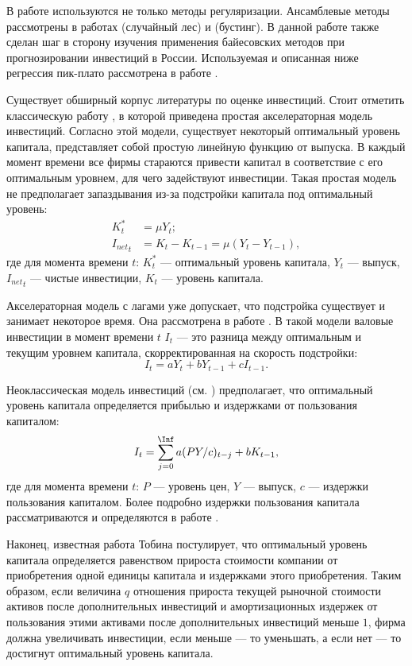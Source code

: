  
 В работе используются не только методы регуляризации. Ансамблевые методы рассмотрены в работах \cite{breiman2001random} (случайный лес) и \cite{efron1994introduction} (бустинг). В данной работе также сделан шаг в сторону изучения применения байесовских методов при прогнозировании инвестиций в России. Используемая и описанная ниже регрессия пик-плато рассмотрена в работе \cite{ishwaran2005spike}.

Существует обширный корпус литературы по оценке инвестиций. Стоит отметить классическую работу \cite{clark1917business}, в которой приведена простая акселераторная модель инвестиций. Согласно этой модели, существует некоторый оптимальный уровень капитала, представляет собой простую линейную функцию от выпуска. В каждый момент времени все фирмы стараются привести капитал в соответствие с его оптимальным уровнем, для чего задействуют инвестиции. Такая простая модель не предполагает запаздывания из-за подстройки капитала под оптимальный уровень:
\begin{align}
    K_t^* &= \mu Y_t;\\
    {I_{net}}_t &= K_t - K_{t-1} = \mu(Y_t - Y_{t-1}),
\end{align}
где для момента времени $t$: $ K_t^*$ --- оптимальный уровень капитала, $Y_t$ --- выпуск, ${I_{net}}_t$ --- чистые инвестиции, $K_t$ --- уровень капитала.

Акселераторная модель с лагами уже допускает, что подстройка существует и занимает некоторое время. Она рассмотрена в работе \cite{guitton1955koyck}.
В такой модели валовые инвестиции в момент времени $t$ $I_t$ --- это разница между оптимальным и текущим уровнем капитала, скорректированная на скорость подстройки:
\begin{equation}
    I_t = a Y_t + b Y_{t-1} + c I_{t-1}.
\end{equation}


Неоклассическая модель инвестиций (см. \cite{jorgenson1963capital}) предполагает, что оптимальный уровень капитала определяется прибылью и издержками от пользования капиталом:
\begin{equation}
    I_t = \sum_{j = 0}^{\Inf}a (P Y/c)_{t-j} + b K_{t-1},
\end{equation}
где для момента времени $t$: $P$ --- уровень цен, $Y$ --- выпуск, $c$ --- издержки пользования капиталом. Более подробно издержки пользования капитала рассматриваются и определяются в работе \cite{christensen1969measurement}.

Наконец, известная работа Тобина \cite{tobin1969general} постулирует, что оптимальный уровень капитала определяется равенством прироста стоимости компании от приобретения одной единицы капитала и издержками этого приобретения. Таким образом, если величина $q$ отношения прироста текущей рыночной стоимости активов после дополнительных инвестиций и амортизационных издержек от пользования этими активами после дополнительных инвестиций меньше $1$, фирма должна увеличивать инвестиции, если меньше --- то уменьшать, а если нет --- то достигнут оптимальный уровень капитала.

